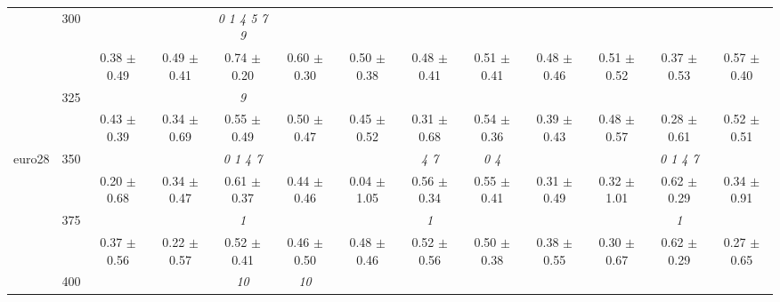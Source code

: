 \begin{table}[h]
{\begin{tabular}{
        ccccccccccccc}
 & \multirow{2}{*}{300}& & & \textit{ 0 1 4 5 7 9 }& & & & & & & &  \\ 
 & & 0.38 $\pm$ 0.49& 0.49 $\pm$ 0.41& 0.74 $\pm$ 0.20& 0.60 $\pm$ 0.30& 0.50 $\pm$ 0.38& 0.48 $\pm$ 0.41& 0.51 $\pm$ 0.41& 0.48 $\pm$ 0.46& 0.51 $\pm$ 0.52& 0.37 $\pm$ 0.53& 0.57 $\pm$ 0.40 \\ 
 & \multirow{2}{*}{325}& \cellcolor[HTML]{EFEFEF} & \cellcolor[HTML]{EFEFEF} & \cellcolor[HTML]{EFEFEF} \textit{ 9 }& \cellcolor[HTML]{EFEFEF} & \cellcolor[HTML]{EFEFEF} & \cellcolor[HTML]{EFEFEF} & \cellcolor[HTML]{EFEFEF} & \cellcolor[HTML]{EFEFEF} & \cellcolor[HTML]{EFEFEF} & \cellcolor[HTML]{EFEFEF} & \cellcolor[HTML]{EFEFEF}  \\ 
 & & \cellcolor[HTML]{EFEFEF} 0.43 $\pm$ 0.39& \cellcolor[HTML]{EFEFEF} 0.34 $\pm$ 0.69& \cellcolor[HTML]{EFEFEF} 0.55 $\pm$ 0.49& \cellcolor[HTML]{EFEFEF} 0.50 $\pm$ 0.47& \cellcolor[HTML]{EFEFEF} 0.45 $\pm$ 0.52& \cellcolor[HTML]{EFEFEF} 0.31 $\pm$ 0.68& \cellcolor[HTML]{EFEFEF} 0.54 $\pm$ 0.36& \cellcolor[HTML]{EFEFEF} 0.39 $\pm$ 0.43& \cellcolor[HTML]{EFEFEF} 0.48 $\pm$ 0.57& \cellcolor[HTML]{EFEFEF} 0.28 $\pm$ 0.61& \cellcolor[HTML]{EFEFEF} 0.52 $\pm$ 0.51 \\ 
 \multirow{4}{*}{euro28} & \multirow{2}{*}{350}& & & \textit{ 0 1 4 7 }& & & \textit{ 4 7 }& \textit{ 0 4 }& & & \textit{ 0 1 4 7 }&  \\ 
 & & 0.20 $\pm$ 0.68& 0.34 $\pm$ 0.47& 0.61 $\pm$ 0.37& 0.44 $\pm$ 0.46& 0.04 $\pm$ 1.05& 0.56 $\pm$ 0.34& 0.55 $\pm$ 0.41& 0.31 $\pm$ 0.49& 0.32 $\pm$ 1.01& 0.62 $\pm$ 0.29& 0.34 $\pm$ 0.91 \\ 
 & \multirow{2}{*}{375}& \cellcolor[HTML]{EFEFEF} & \cellcolor[HTML]{EFEFEF} & \cellcolor[HTML]{EFEFEF} \textit{ 1 }& \cellcolor[HTML]{EFEFEF} & \cellcolor[HTML]{EFEFEF} & \cellcolor[HTML]{EFEFEF} \textit{ 1 }& \cellcolor[HTML]{EFEFEF} & \cellcolor[HTML]{EFEFEF} & \cellcolor[HTML]{EFEFEF} & \cellcolor[HTML]{EFEFEF} \textit{ 1 }& \cellcolor[HTML]{EFEFEF}  \\ 
 & & \cellcolor[HTML]{EFEFEF} 0.37 $\pm$ 0.56& \cellcolor[HTML]{EFEFEF} 0.22 $\pm$ 0.57& \cellcolor[HTML]{EFEFEF} 0.52 $\pm$ 0.41& \cellcolor[HTML]{EFEFEF} 0.46 $\pm$ 0.50& \cellcolor[HTML]{EFEFEF} 0.48 $\pm$ 0.46& \cellcolor[HTML]{EFEFEF} 0.52 $\pm$ 0.56& \cellcolor[HTML]{EFEFEF} 0.50 $\pm$ 0.38& \cellcolor[HTML]{EFEFEF} 0.38 $\pm$ 0.55& \cellcolor[HTML]{EFEFEF} 0.30 $\pm$ 0.67& \cellcolor[HTML]{EFEFEF} 0.62 $\pm$ 0.29& \cellcolor[HTML]{EFEFEF} 0.27 $\pm$ 0.65 \\ 
 & \multirow{2}{*}{400}& & & \textit{ 10 }& \textit{ 10 }& & & & & & &  \\ 

\end{tabular}}
\end{table}
